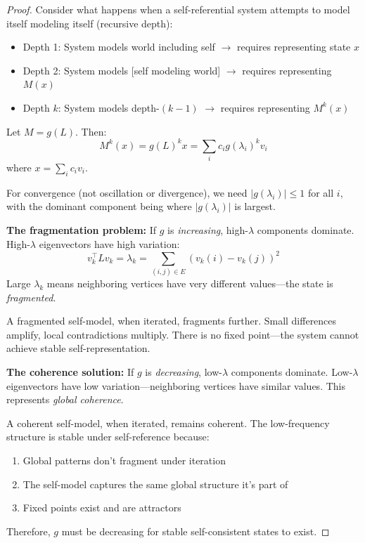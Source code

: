 \documentclass[11pt]{article}
\theoremstyle{definition}
\theoremstyle{remark}
\begin{document}
\begin{proof}
Consider what happens when a self-referential system attempts to model itself modeling itself (recursive depth):
\begin{itemize}
    \item Depth 1: System models world including self $\to$ requires representing state $x$
    \item Depth 2: System models [self modeling world] $\to$ requires representing $M(x)$
    \item Depth $k$: System models depth-$(k-1)$ $\to$ requires representing $M^k(x)$
\end{itemize}

Let $M = g(L)$. Then:
\[
M^k(x) = g(L)^k x = \sum_i c_i g(\lambda_i)^k v_i
\]
where $x = \sum_i c_i v_i$.

For convergence (not oscillation or divergence), we need $|g(\lambda_i)| \leq 1$ for all $i$, with the dominant component being where $|g(\lambda_i)|$ is largest.

\textbf{The fragmentation problem:} If $g$ is \emph{increasing}, high-$\lambda$ components dominate. High-$\lambda$ eigenvectors have high variation:
\[
v_k^\top L v_k = \lambda_k = \sum_{(i,j) \in E} (v_k(i) - v_k(j))^2
\]
Large $\lambda_k$ means neighboring vertices have very different values---the state is \emph{fragmented}.

A fragmented self-model, when iterated, fragments further. Small differences amplify, local contradictions multiply. There is no fixed point---the system cannot achieve stable self-representation.

\textbf{The coherence solution:} If $g$ is \emph{decreasing}, low-$\lambda$ components dominate. Low-$\lambda$ eigenvectors have low variation---neighboring vertices have similar values. This represents \emph{global coherence}.

A coherent self-model, when iterated, remains coherent. The low-frequency structure is stable under self-reference because:
\begin{enumerate}
    \item Global patterns don't fragment under iteration
    \item The self-model captures the same global structure it's part of
    \item Fixed points exist and are attractors
\end{enumerate}

Therefore, $g$ must be decreasing for stable self-consistent states to exist.
\end{proof}
\end{document}
